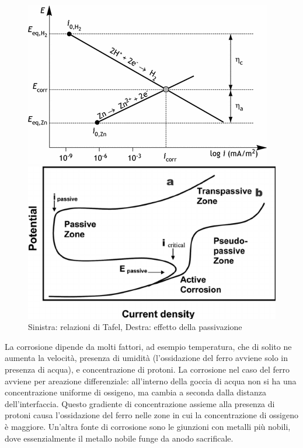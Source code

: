 \begin{figure}[h]
    \centering
    \begin{minipage}{0.5\textwidth}
        \centering
        \includegraphics[width=0.7\linewidth]{frattura/tafel.png} %
        
    \end{minipage}\hfill
    \begin{minipage}{0.5\textwidth}
        \centering
        \includegraphics[width=0.7\linewidth]{frattura/passivation.png} %
        
    \end{minipage}
    \caption{Sinistra: relazioni di Tafel, Destra: effetto della passivazione}
    \label{passivation}
\end{figure}

La corrosione dipende da molti fattori, ad esempio temperatura, che di solito ne aumenta la velocità, presenza di umidità (l'ossidazione del ferro avviene solo in presenza di acqua), e concentrazione di protoni. La corrosione nel caso del ferro avviene per areazione differenziale: all'interno della goccia di acqua non si ha una concentrazione uniforme di ossigeno, ma cambia a seconda dalla distanza dell'interfaccia. Questo gradiente di concentrazione assieme alla presenza di protoni causa l'ossidazione del ferro nelle zone in cui la concentrazione di ossigeno è maggiore. Un'altra fonte di corrosione sono le giunzioni con metalli più nobili, dove essenzialmente il metallo nobile funge da anodo sacrificale.